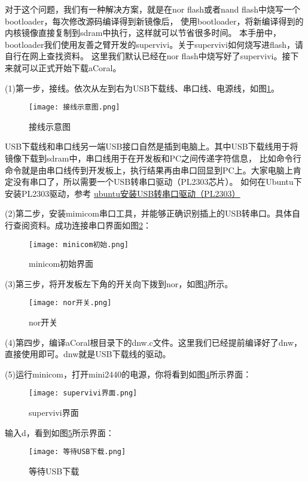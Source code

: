 对于这个问题，我们有一种解决方案，就是在nor flash或者nand flash中烧写一个bootloader，每次修改源码编译得到新镜像后，
使用bootloader，将新编译得到的内核镜像直接复制到sdram中执行，这样就可以节省很多时间。
本手册中，bootloader我们使用友善之臂开发的supervivi。关于supervivi如何烧写进flash，请自行在网上查找资料。
这里我们默认已经在nor flash中烧写好了supervivi。接下来就可以正式开始下载aCoral。

(1)第一步，接线。依次从左到右为USB下载线、串口线、电源线，如图\ref{接线示意图}。
\begin{figure}[H]
	\texttt{[image: 接线示意图.png]}
	\caption{接线示意图}
	\label{接线示意图}
\end{figure}

USB下载线和串口线另一端USB接口自然是插到电脑上。其中USB下载线用于将镜像下载到sdram中，串口线用于在开发板和PC之间传递字符信息，
比如命令行命令就是由串口线传到开发板上，执行结果再由串口回显到PC上。大家电脑上肯定没有串口了，所以需要一个USB转串口驱动（PL2303芯片）。
如何在Ubuntu下安装PL2303驱动，参考 \href{https://blog.csdn.net/qq_34562093/article/details/75059251}{\underline{ubuntu安装USB转串口驱动（PL2303）}}

(2)第二步，安装mimicom串口工具，并能够正确识别插上的USB转串口。具体自行查阅资料。成功连接串口界面如图\ref{minicom初始}：
\begin{figure}[H]
	\texttt{[image: minicom初始.png]}
	\caption{minicom初始界面}
	\label{minicom初始}
\end{figure}

(3)第三步，将开发板左下角的开关向下拨到nor，如图\ref{nor开关}所示。
\begin{figure}[H]
	\texttt{[image: nor开关.png]}
	\caption{nor开关}
	\label{nor开关}
\end{figure}

(4)第四步，编译aCoral根目录下的dnw.c文件。这里我们已经提前编译好了dnw，直接使用即可。dnw就是USB下载线的驱动。

(5)运行minicom，打开mini2440的电源，你将看到如图\ref{supervivi界面}所示界面：
\begin{figure}[H]
	\texttt{[image: supervivi界面.png]}
	\caption{supervivi界面}
	\label{supervivi界面}
\end{figure}

输入d，看到如图\ref{等待USB下载}所示界面：
\begin{figure}[H]
	\texttt{[image: 等待USB下载.png]}
	\caption{等待USB下载}
	\label{等待USB下载}
\end{figure}

